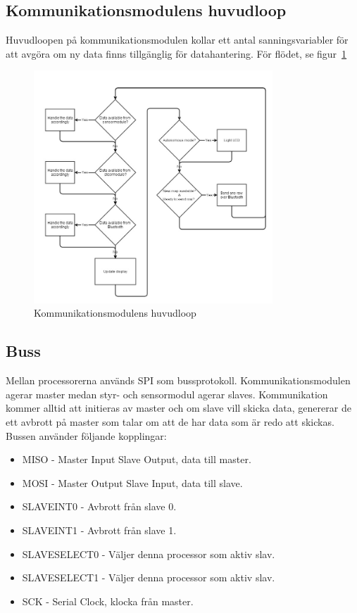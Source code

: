 \documentclass[a4paper,12pt,fleqn]{article}
\begin{document}
\subsection{Kommunikationsmodulens huvudloop}

Huvudloopen på kommunikationsmodulen kollar ett antal sanningsvariabler för att avgöra om ny data finns tillgänglig för datahantering. För flödet, se figur~\ref{fig:mainmaster}

\begin{figure}[htp] %
  \begin{center}
  \includegraphics[keepaspectratio=true,width=0.8\textwidth]{bilder/mainmaster.jpg}  %
  \end{center}
  \caption{Kommunikationsmodulens huvudloop} %
  \label{fig:mainmaster}
\end{figure}

\subsection{Buss}
Mellan processorerna används SPI som bussprotokoll. Kommunikationsmodulen agerar master medan styr- och sensormodul agerar slaves. Kommunikation kommer alltid att initieras av master och om slave vill skicka data, genererar de ett avbrott på master som talar om att de har data som är redo att skickas. Bussen använder följande kopplingar:
\begin{itemize}
	\item MISO - Master Input Slave Output, data till master.
	\item MOSI - Master Output Slave Input, data till slave.
	\item SLAVEINT0 - Avbrott från slave 0.
	\item SLAVEINT1 - Avbrott från slave 1.
	\item SLAVESELECT0 - Väljer denna processor som aktiv slav.
	\item SLAVESELECT1 - Väljer denna processor som aktiv slav.
	\item SCK - Serial Clock, klocka från master.
\end{itemize}
\end{document}
